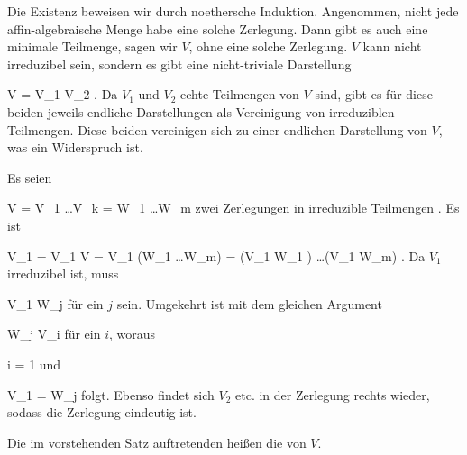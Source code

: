 {




\teilbeweis {}{}{}
{Die Existenz beweisen wir durch noethersche Induktion. Angenommen, nicht jede affin-algebraische Menge habe eine solche Zerlegung. Dann gibt es auch eine minimale Teilmenge, sagen wir $V$, ohne eine solche Zerlegung. $V$ kann nicht irreduzibel sein, sondern es gibt eine nicht-triviale Darstellung

\mavergleichskette
{\vergleichskette
{V
}
{ = }{ V_1 \cup V_2
}
{  }{
}
{    }{
}
{   }{
}
}
{}{}{.}
Da $V_1$ und $V_2$ echte Teilmengen von $V$ sind, gibt es für diese beiden jeweils endliche Darstellungen als Vereinigung von irreduziblen Teilmengen. Diese beiden vereinigen sich zu einer endlichen Darstellung von $V$, was ein Widerspruch ist.}
{}
{Es seien

\mavergleichskettedisp
{\vergleichskette
{ V
}
{ =} { V_1 \cup \ldots \cup V_k
}
{ =} { W_1 \cup \ldots \cup W_m
}
{ } {
}
{ } {
}
}
{}{}{}
zwei Zerlegungen in irreduzible Teilmengen
 {} {.}
Es ist

\mavergleichskettedisp
{\vergleichskette
{ V_1
}
{ =} { V_1 \cap V
}
{ =} { V_1 \cap (W_1 \cup \ldots \cup W_m)
}
{ =} { (V_1 \cap W_1 ) \cup \ldots \cup (V_1 \cap W_m)
}
{ } {
}
}
{}{}{.}
Da $V_1$ irreduzibel ist, muss

\mavergleichskette
{\vergleichskette
{ V_1
}
{ \subseteq }{ W_j
}
{  }{
}
{    }{
}
{   }{
}
}
{}{}{}
für ein $j$ sein. Umgekehrt ist mit dem gleichen Argument

\mavergleichskette
{\vergleichskette
{ W_j
}
{ \subseteq }{ V_i
}
{  }{
}
{    }{
}
{   }{
}
}
{}{}{}
für ein $i$, woraus

\mavergleichskette
{\vergleichskette
{ i
}
{ = }{ 1
}
{  }{
}
{    }{
}
{   }{
}
}
{}{}{}
und

\mavergleichskette
{\vergleichskette
{ V_1
}
{ = }{ W_j
}
{  }{
}
{    }{
}
{   }{
}
}
{}{}{}
folgt. Ebenso findet sich $V_2$ etc. in der Zerlegung rechts wieder, sodass die Zerlegung eindeutig ist.}
{}




}


Die im vorstehenden Satz auftretenden
 heißen die
von $V$.









